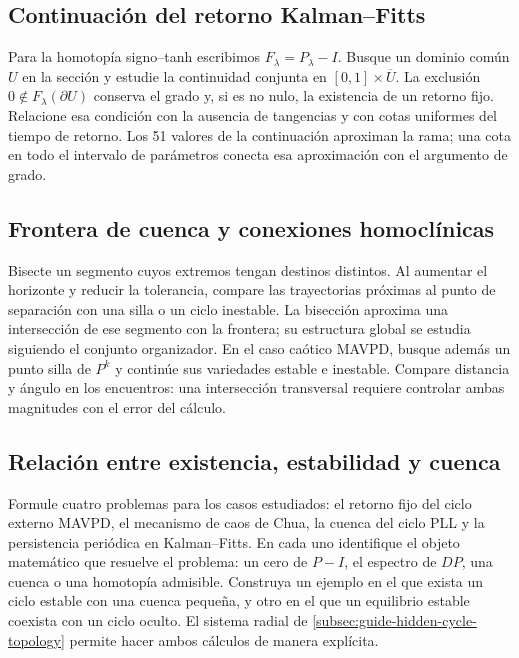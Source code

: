 \subsection{Continuación del retorno Kalman--Fitts}
Para la homotopía signo--tanh escribimos \(F_\lambda=P_\lambda-I\).
Busque un dominio común \(U\) en la sección y estudie la continuidad conjunta
en \([0,1]\times\overline U\). La exclusión
\(0\notin F_\lambda(\partial U)\) conserva el grado y, si es no nulo,
la existencia de un retorno fijo. Relacione esa condición con la ausencia
de tangencias y con cotas uniformes del tiempo de retorno. Los 51 valores
de la continuación aproximan la rama; una cota en todo el intervalo de
parámetros conecta esa aproximación con el argumento de grado.

\subsection{Frontera de cuenca y conexiones homoclínicas}
Bisecte un segmento cuyos extremos tengan destinos distintos. Al aumentar
el horizonte y reducir la tolerancia, compare las trayectorias próximas al
punto de separación con una silla o un ciclo inestable. La bisección aproxima
una intersección de ese segmento con la frontera; su estructura global se
estudia siguiendo el conjunto organizador. En el caso caótico MAVPD,
busque además un punto silla de \(P^k\) y continúe sus variedades estable e
inestable. Compare distancia y ángulo en los encuentros: una intersección
transversal requiere controlar ambas magnitudes con el error del cálculo.

\subsection{Relación entre existencia, estabilidad y cuenca}
Formule cuatro problemas para los casos estudiados: el retorno fijo del
ciclo externo MAVPD, el mecanismo de caos de Chua, la cuenca del ciclo PLL y
la persistencia periódica en Kalman--Fitts. En cada uno identifique el
objeto matemático que resuelve el problema: un cero de \(P-I\), el espectro
de \(DP\), una cuenca o una homotopía admisible. Construya un ejemplo en
el que exista un ciclo estable con una cuenca pequeña, y otro en el que un
equilibrio estable coexista con un ciclo oculto. El sistema radial de
\cref{subsec:guide-hidden-cycle-topology} permite hacer ambos cálculos
de manera explícita.

\fi
\fi
\fi

\ifdefined\HAFONoGeoPosterior\else
\ifdefined\HAFOGeoBlockSelect\else
